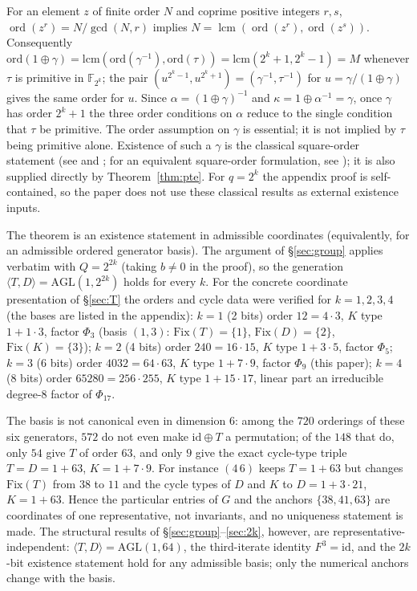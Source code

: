 \documentclass[11pt]{article}
\begin{document}
For an element $z$ of finite order $N$ and coprime positive integers $r,s$,
$\operatorname{ord}(z^r)=N/\gcd(N,r)$ implies
$N=\operatorname{lcm}(\operatorname{ord}(z^r),\operatorname{ord}(z^s))$.
Consequently
$\mathrm{ord}(1\oplus\gamma)=\mathrm{lcm}(\mathrm{ord}(\gamma^{-1}),\mathrm{ord}(\tau))
=\mathrm{lcm}(2^k+1,2^k-1)=M$ whenever $\tau$ is primitive in $\mathbb{F}_{2^k}$;
the pair $(u^{2^k-1},u^{2^k+1})=(\gamma^{-1},\tau^{-1})$ for
$u=\gamma/(1\oplus\gamma)$ gives the same order for $u$. Since
$\alpha=(1\oplus\gamma)^{-1}$ and
$\kappa=1\oplus\alpha^{-1}=\gamma$, once $\gamma$
has order $2^k+1$ the three order conditions on $\alpha$ reduce to the single
condition that $\tau$ be primitive. The order assumption on $\gamma$ is
essential; it is not implied by $\tau$ being primitive alone.
Existence of such a $\gamma$ is the classical square-order statement
(see \cite{Mor} and \cite[Theorem~1, p.~1]{Coh90}; for an equivalent square-order formulation, see
\cite[Theorem~1.5, p.~170]{Coh}); it is also supplied directly by
Theorem~\ref{thm:pte}.
For $q=2^k$ the appendix proof is self-contained, so the paper does not use these
classical results as external existence inputs.

The theorem is an existence statement in admissible coordinates (equivalently, for an
admissible ordered generator basis). The argument of \S\ref{sec:group} applies verbatim
with $Q=2^{2k}$ (taking $b\ne0$ in the proof), so the generation
$\langle T,D\rangle=\mathrm{AGL}(1,2^{2k})$ holds for every $k$. For the concrete
coordinate presentation of \S\ref{sec:T} the orders and cycle data were verified
for $k=1,2,3,4$ (the bases are listed in the appendix):
$k=1$ (2 bits) order $12=4\cdot3$, $K$ type $1+1\cdot3$, factor
$\Phi_3$ (basis $(1,3)$: $\mathrm{Fix}(T)=\{1\}$, $\mathrm{Fix}(D)=\{2\}$,
$\mathrm{Fix}(K)=\{3\}$); $k=2$ (4 bits) order $240=16\cdot15$, $K$ type
$1+3\cdot5$, factor $\Phi_5$; $k=3$ (6 bits) order $4032=64\cdot63$, $K$ type
$1+7\cdot9$, factor $\Phi_9$ (this paper); $k=4$ (8 bits) order
$65280=256\cdot255$, $K$ type $1+15\cdot17$, linear part an irreducible degree-$8$
factor of $\Phi_{17}$.

The basis is not canonical even in dimension $6$: among the $720$ orderings of these
six generators, $572$ do not even make $\mathrm{id}\oplus T$ a permutation; of the $148$
that do, only $54$ give $T$ of order $63$, and only $9$ give the exact cycle-type triple
$T=D=1+63$, $K=1+7\cdot9$. For instance $(4\,6)$ keeps $T=1+63$ but changes
$\mathrm{Fix}(T)$ from $38$ to $11$ and the cycle types of $D$ and $K$ to $D=1+3\cdot21$,
$K=1+63$. Hence the particular entries of $G$ and the anchors $\{38,41,63\}$ are coordinates
of one representative, not invariants, and no uniqueness statement is made. The structural results of \S\ref{sec:group}--\ref{sec:2k},
however, are representative-independent: $\langle T,D\rangle=\mathrm{AGL}(1,64)$, the
third-iterate identity $F^3=\mathrm{id}$, and the $2k$-bit existence statement hold for any
admissible basis; only the numerical anchors change with the basis.
\end{document}
